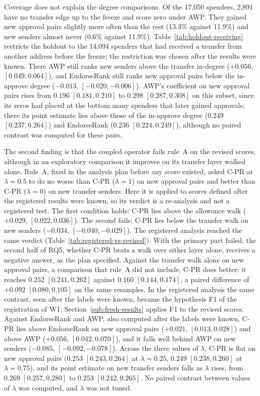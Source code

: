 Coverage does not explain the degree comparisons. Of the 17,050 spenders, 2,891 have no transfer edge up to the freeze and score zero under AWP. They gained new approval pairs slightly more often than the rest (13.3\% against 11.9\%) and new senders almost never (0.6\% against 11.9\%). Table~\ref{tab:holdout-receiving} restricts the holdout to the 14,094 spenders that had received a transfer from another address before the freeze; the restriction was chosen after the results were known. There AWP still ranks new senders above the transfer in-degree ($+0.056$, $[0.049,0.064]$), and EndorseRank still ranks new approval pairs below the in-approve degree ($-0.013$, $[-0.020,-0.006]$). AWP's coefficient on new approval pairs rises from $0.196$ $[0.181,0.210]$ to $0.298$ $[0.287,0.308]$ on this subset, since its zeros had placed at the bottom many spenders that later gained approvals; there its point estimate lies above those of the in-approve degree ($0.249$ $[0.237,0.264]$) and EndorseRank ($0.236$ $[0.224,0.249]$), although no paired contrast was computed for these pairs.



The second finding is that the coupled operator fails rule~A on the revised scores, although in an exploratory comparison it improves on its transfer layer walked alone. Rule~A, fixed in the analysis plan before any score existed, asked C-PR at $\lambda=0.5$ to do no worse than C-PR ($\lambda=1$) on new approval pairs and better than C-PR ($\lambda=0$) on new transfer senders. Here it is applied to scores defined after the registered results were known, so its verdict is a re-analysis and not a registered test. The first condition holds: C-PR lies above the allowance walk ($+0.029$, $[0.022,0.036]$). The second fails: C-PR lies below the transfer walk on new senders ($-0.034$, $[-0.040,-0.029]$). The registered analysis reached the same verdict (Table~\ref{tab:registered-vs-revised}). With the primary part failed, the second half of RQ5, whether C-PR beats a walk over either layer alone, receives a negative answer, as the plan specified. Against the transfer walk alone on new approval pairs, a comparison that rule~A did not include, C-PR does better: it reaches $0.252$ $[0.241,0.262]$ against $0.160$ $[0.144,0.174]$, a paired difference of $+0.092$ $[0.080,0.105]$ on the same resamples. In the registered analysis the same contrast, seen after the labels were known, became the hypothesis F1 of the registration of W1; Section~\ref{sub:fresh-results} applies F1 to the revised scores. Against EndorseRank and AWP, also computed after the labels were known, C-PR lies above EndorseRank on new approval pairs ($+0.021$, $[0.013,0.028]$) and above AWP ($+0.056$, $[0.042,0.070]$), and it falls well behind AWP on new senders ($-0.085$, $[-0.092,-0.078]$). Across the three values of $\lambda$, C-PR is flat on new approval pairs ($0.253$ $[0.243,0.264]$ at $\lambda=0.25$, $0.249$ $[0.238,0.260]$ at $\lambda=0.75$), and its point estimate on new transfer senders falls as $\lambda$ rises, from $0.269$ $[0.257,0.280]$ to $0.253$ $[0.242,0.265]$. No paired contrast between values of $\lambda$ was computed, and $\lambda$ was not tuned.

